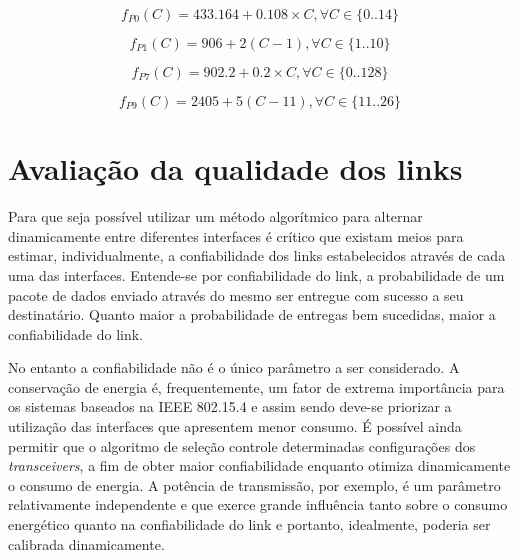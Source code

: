 \documentclass{article}
\begin{document}
	\begin{equation}
		\label{eq:ch433msk}
		f_{P0}(C) = 433.164 + 0.108\times C, \forall C \in \{0..14\}
	\end{equation}
	
	\begin{equation}
		\label{eq:ch915ask}
		f_{P1}(C) = 906 + 2 (C - 1), \forall C \in \{1..10\}
	\end{equation}
	
	\begin{equation}
		\label{eq:ch915fsk}
		f_{P7}(C) = 902.2 + 0.2 \times C, \forall C \in \{0..128\}
	\end{equation}
		
	\begin{equation}
		\label{eq:ch2450oqpsk}
		f_{P9}(C) = 2405 + 5 (C - 11), \forall C \in \{11..26\}
	\end{equation}
\clearpage

\section{Avaliação da qualidade dos links}
	Para que seja possível utilizar um método algorítmico para alternar dinamicamente entre diferentes interfaces é crítico que existam meios para estimar, individualmente, a confiabilidade dos links estabelecidos através de cada uma das interfaces.  
	Entende-se por confiabilidade do link, a probabilidade de um pacote de dados enviado através do mesmo ser entregue com sucesso a seu destinatário. Quanto maior a probabilidade de entregas bem sucedidas, maior a confiabilidade do link. 

	No entanto a confiabilidade não é o único parâmetro a ser considerado. A conservação de energia é, frequentemente, um fator de extrema importância para os sistemas baseados na IEEE 802.15.4 e assim sendo deve-se priorizar a utilização das interfaces que apresentem menor consumo. É possível ainda permitir que o algoritmo de seleção controle determinadas configurações dos \textit{transceivers}, a fim de obter maior confiabilidade enquanto otimiza dinamicamente o consumo de energia. A potência de transmissão, por exemplo, é um parâmetro relativamente independente e que exerce grande influência tanto sobre o consumo energético quanto na confiabilidade do link e portanto, idealmente, poderia ser calibrada dinamicamente.
\clearpage
\end{document}
